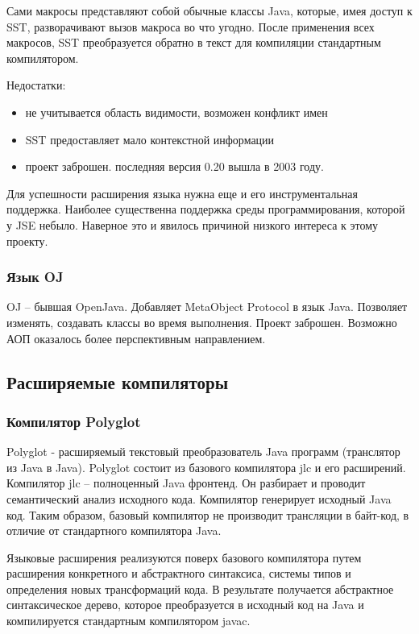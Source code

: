 \documentclass[a4paper,12pt,titlepage]{extarticle}
\begin{document}
Сами макросы представляют собой обычные классы Java, которые, имея доступ к
SST, разворачивают вызов макроса во что угодно. После применения всех макросов,
SST преобразуется обратно в текст для компиляции стандартным компилятором.

Недостатки:
\begin{itemize}
 \item не учитывается область видимости, возможен конфликт имен
 \item SST предоставляет мало контекстной информации
 \item проект заброшен. последняя версия 0.20 вышла в 2003 году.
\end{itemize}
Для успешности расширения языка нужна еще и его инструментальная поддержка.
Наиболее существенна поддержка среды программирования, которой у JSE небыло.
Наверное это и явилось причиной низкого интереса к этому проекту.

\subsubsection*{Язык OJ}
OJ -- бывшая OpenJava. Добавляет MetaObject Protocol в язык Java.
Позволяет изменять, создавать классы во время выполнения.
Проект заброшен. Возможно АОП оказалось более перспективным направлением.

\subsection{Расширяемые компиляторы}
\label{extcomp}
\subsubsection*{Компилятор Polyglot}
Polyglot - расширяемый текстовый преобразователь Java программ (транслятор из
Java в Java). Polyglot состоит из базового компилятора jlc и его расширений.
Компилятор jlc -- полноценный Java фронтенд. Он разбирает и проводит
семантический анализ исходного кода. Компилятор генерирует исходный Java код.
Таким образом, базовый компилятор не производит трансляции в байт-код, в
отличие от стандартного компилятора Java.

Языковые расширения реализуются поверх базового компилятора путем расширения
конкретного и абстрактного синтаксиса, системы типов и определения новых
трансформаций кода. В результате получается абстрактное синтаксическое дерево,
которое преобразуется в исходный код на Java и компилируется стандартным
компилятором javac.
\end{document}
